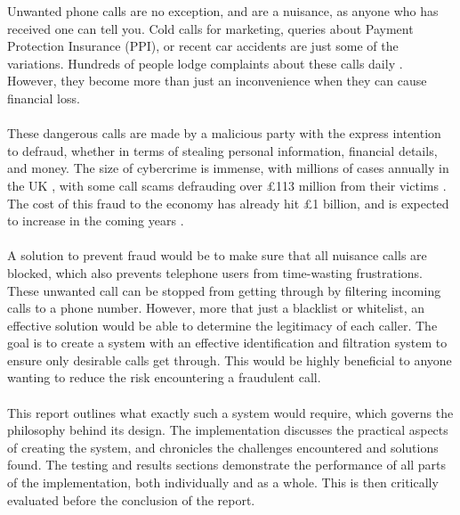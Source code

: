 Unwanted phone calls are no exception, and are a nuisance, as anyone who has received one can tell you. Cold calls for marketing, queries about Payment Protection Insurance (PPI), or recent car accidents are just some of the variations. Hundreds of people lodge complaints about these calls daily \cite{bbc-coldcalls}. However, they become more than just an inconvenience when they can cause financial loss.
\\\\
These dangerous calls are made by a malicious party with the express intention to defraud, whether in terms of stealing personal information, financial details, and money. The size of cybercrime is immense, with millions of cases annually in the UK \cite{bbc-number}, with some call scams defrauding over £113 million from their victims \cite{guardian-cost}. The cost of this fraud to the economy has already hit £1 billion, and is expected to increase in the coming years \cite{guardian-cost}.
\\\\
A solution to prevent fraud would be to make sure that all nuisance calls are blocked, which also prevents telephone users from time-wasting frustrations. These unwanted call can be stopped from getting through by filtering incoming calls to a phone number. However, more that just a blacklist or whitelist, an effective solution would be able to determine the legitimacy of each caller. The goal is to create a system with an effective identification and filtration system to ensure only desirable calls get through. This would be highly beneficial to anyone wanting to reduce the risk encountering a fraudulent call.
\\\\
This report outlines what exactly such a system would require, which governs the philosophy behind its design. The implementation discusses the practical aspects of creating the system, and chronicles the challenges encountered and solutions found. The testing and results sections demonstrate the performance of all parts of the implementation, both individually and as a whole. This is then critically evaluated before the conclusion of the report.
% 

